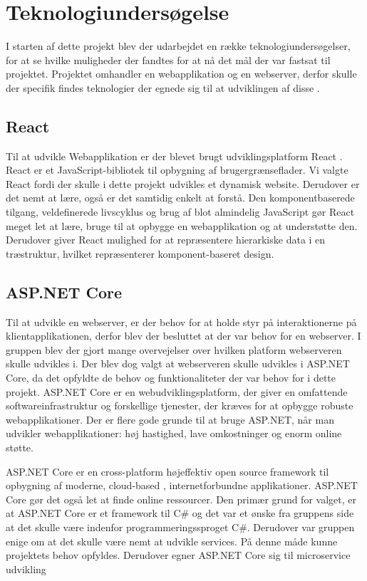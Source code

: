 \chapter{Teknologiundersøgelse}

I starten af dette projekt blev der udarbejdet en række teknologiundersøgelser, for at se hvilke muligheder der fandtes for at nå det mål der var fastsat til projektet. Projektet omhandler en webapplikation og en webserver, derfor skulle der specifik findes teknologier der egnede sig til at udviklingen af disse \cite{Research}.    

\section{React}

Til at udvikle Webapplikation er der blevet brugt udviklingsplatform React \cite[React]{converge-terms}. React er et JavaScript-bibliotek til opbygning af brugergrænseflader. Vi valgte React fordi der skulle i dette projekt udvikles et dynamisk website. Derudover er det nemt at lære, også er det samtidig enkelt at forstå. Den komponentbaserede tilgang, veldefinerede livscyklus og brug af blot almindelig JavaScript gør React meget let at lære, bruge til at opbygge en webapplikation og at understøtte den. Derudover giver React mulighed for at repræsentere hierarkiske data i en træstruktur, hvilket repræsenterer komponent-baseret design.

\section{ASP.NET Core}

Til at udvikle en webserver, er der behov for at holde styr på interaktionerne på klientapplikationen, derfor blev der besluttet at der var behov for en webserver. I gruppen blev der gjort mange overvejelser over hvilken platform webserveren skulle udvikles i. Der blev dog valgt at webserveren skulle udvikles i ASP.NET Core, da det opfyldte de behov og funktionaliteter der var behov for i dette projekt. ASP.NET Core er en webudviklingsplatform, der giver en omfattende softwareinfrastruktur \cite[Softwareinfrastruktur]{converge-terms} og forskellige tjenester, der kræves for at opbygge robuste webapplikationer. Der er flere gode grunde til at bruge ASP.NET, når man udvikler webapplikationer: høj hastighed, lave omkostninger og enorm online støtte. 

ASP.NET Core er en cross-platform højeffektiv open source framework til opbygning af moderne, cloud-based \cite[Cloud Based]{converge-terms}, internetforbundne applikationer. ASP.NET Core gør det også let at finde online ressourcer. Den primær grund for valget, er at ASP.NET Core er et framework til C\# og det var et ønske fra gruppens side at det skulle være indenfor programmeringssproget C\#. Derudover var gruppen enige om at det skulle være nemt at udvikle services. På denne måde kunne projektets behov opfyldes. Derudover egner ASP.NET Core sig til microservice \cite[Microservice]{converge-terms} udvikling


